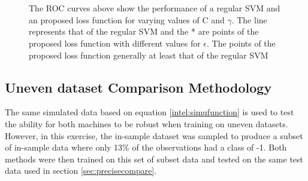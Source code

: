 	\begin{figure}[htp]
	  \begin{center}
		\\
		\\
	  \end{center}
	  \caption{The ROC curves above show the performance of a regular SVM and an proposed loss function for varying values of C and $\gamma$. The line represents that of the regular SVM and the * are points of the proposed loss function with different values for $\epsilon$. The points of the proposed loss function generally at least that of the regular SVM}
	  \label{fig:epsilonconstraintsprecision}
	\end{figure}

	\subsection{Uneven dataset Comparison Methodology}
	The same simulated data based on equation \ref{intel:simufunction} is used to test the ability for both machines to be robust when training on uneven datasets. However, in this exercise, the in-sample dataset was sampled to produce a subset of in-sample data where only 13\% of the observations had a class of -1. Both methods were then trained on this set of subset data and tested on the same test data used in section \ref{sec:precisecompare}.



